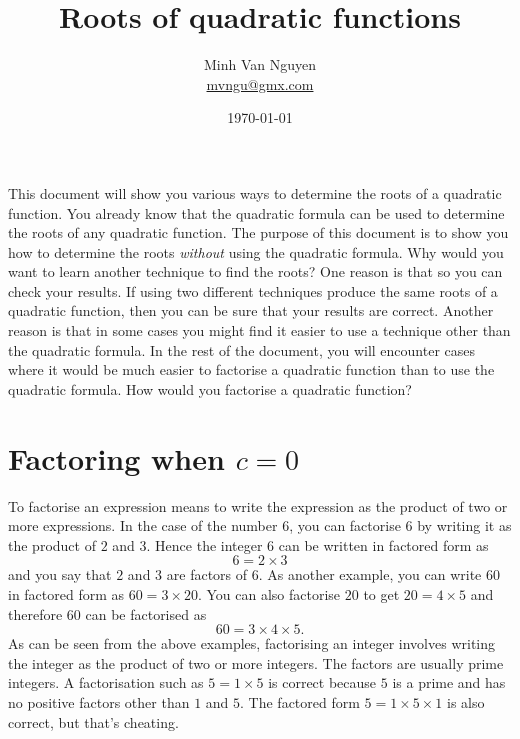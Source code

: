 \documentclass[a4paper,oneside,12pt]{article}
\begin{document}
\title{\Large\bf Roots of quadratic functions}
\author{%
  Minh Van Nguyen \\
  \url{mvngu@gmx.com}
}
\date{\today}
\maketitle

\noindent
This document will show you various ways to determine the roots of a
quadratic function.  You already know that the quadratic formula can
be used to determine the roots of any quadratic function.  The purpose
of this document is to show you how to determine the roots
\emph{without} using the quadratic formula.  Why would you want to
learn another technique to find the roots?  One reason is that so you
can check your results.  If using two different techniques produce the
same roots of a quadratic function, then you can be sure that your
results are correct.  Another reason is that in some cases you might
find it easier to use a technique other than the quadratic formula.
In the rest of the document, you will encounter cases where it would
be much easier to factorise a quadratic function than to use the
quadratic formula.  How would you factorise a quadratic function?



\section{Factoring when $c = 0$}

To factorise an expression means to write the expression as the
product of two or more expressions.  In the case of the number $6$,
you can factorise $6$ by writing it as the product of $2$ and $3$.
Hence the integer $6$ can be written in factored form as
\[
6
=
2 \times 3
\]
and you say that $2$ and $3$ are factors of $6$.  As another example,
you can write $60$ in factored form as $60 = 3 \times 20$.  You can
also factorise $20$ to get $20 = 4 \times 5$ and therefore $60$ can be
factorised as
\[
60
=
3 \times 4 \times 5.
\]
As can be seen from the above examples, factorising an integer
involves writing the integer as the product of two or more integers.
The factors are usually prime integers.  A factorisation such as
$5 = 1 \times 5$ is correct because $5$ is a prime and has no positive
factors other than $1$ and $5$.  The factored form
$5 = 1 \times 5 \times 1$ is also correct, but that's cheating.
\end{document}
